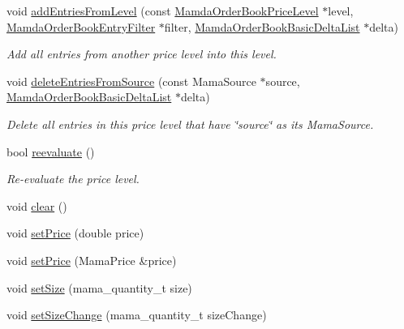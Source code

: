 \begin{CompactItemize}
void \hyperlink{classWombat_1_1MamdaOrderBookPriceLevel_036ea1dce43eea4f932874cd8b8030d9}{add\-Entries\-From\-Level} (const \hyperlink{classWombat_1_1MamdaOrderBookPriceLevel}{Mamda\-Order\-Book\-Price\-Level} $\ast$level, \hyperlink{classWombat_1_1MamdaOrderBookEntryFilter}{Mamda\-Order\-Book\-Entry\-Filter} $\ast$filter, \hyperlink{classWombat_1_1MamdaOrderBookBasicDeltaList}{Mamda\-Order\-Book\-Basic\-Delta\-List} $\ast$delta)
\begin{CompactList}\small\item\em Add all entries from another price level into this level. \item\end{CompactList}\item 
void \hyperlink{classWombat_1_1MamdaOrderBookPriceLevel_bf63aa01d9802e49874653746b521024}{delete\-Entries\-From\-Source} (const Mama\-Source $\ast$source, \hyperlink{classWombat_1_1MamdaOrderBookBasicDeltaList}{Mamda\-Order\-Book\-Basic\-Delta\-List} $\ast$delta)
\begin{CompactList}\small\item\em Delete all entries in this price level that have \char`\"{}source\char`\"{} as its Mama\-Source. \item\end{CompactList}\item 
bool \hyperlink{classWombat_1_1MamdaOrderBookPriceLevel_ef4b9ff3c9200478cfef4f5b885a46c6}{reevaluate} ()
\begin{CompactList}\small\item\em Re-evaluate the price level. \item\end{CompactList}\item 
void \hyperlink{classWombat_1_1MamdaOrderBookPriceLevel_b56d54df153563ad9fd07e9508d6e47c}{clear} ()
\item 
void \hyperlink{classWombat_1_1MamdaOrderBookPriceLevel_6ee9b47163ac334bb9cd31fbd155eb6a}{set\-Price} (double price)
\item 
void \hyperlink{classWombat_1_1MamdaOrderBookPriceLevel_53777c749324feae82c96012e2c96045}{set\-Price} (Mama\-Price \&price)
\item 
void \hyperlink{classWombat_1_1MamdaOrderBookPriceLevel_d97fa63c125f38871bc654c4539d7b91}{set\-Size} (mama\_\-quantity\_\-t size)
\item 
void \hyperlink{classWombat_1_1MamdaOrderBookPriceLevel_fa6a888a7989c844a67e4f9a7d60da4c}{set\-Size\-Change} (mama\_\-quantity\_\-t size\-Change)
\item 

\end{CompactItemize}

